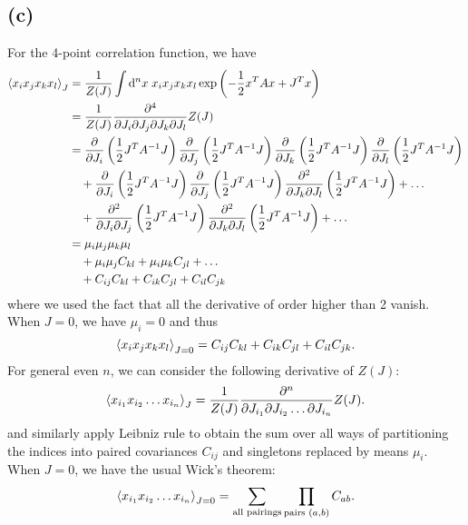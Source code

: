 \documentclass{article}
\begin{document}
\subsection*{(c)}
For the 4-point correlation function, we have
\begin{equation}
    \begin{split}
        \expval{x_i x_j x_k x_l}_J &= \frac{1}{Z(J)} \int \dd^n x \; x_i x_j x_k x_l \exp\left(-\frac{1}{2} x^T A x + J^T x\right)\\ 
                                   &= \frac{1}{Z(J)} \frac{\partial^4}{\partial J_i \partial J_j \partial J_k \partial J_l} Z(J)\\
                                   &= \frac{\partial}{\partial J_i} \left( \frac{1}{2} J^T A^{-1} J  \right)  \frac{\partial}{\partial J_j} \left( \frac{1}{2} J^T A^{-1} J  \right) \frac{\partial}{\partial J_k} \left( \frac{1}{2} J^T A^{-1} J \right)  \frac{\partial}{\partial J_l} \left( \frac{1}{2} J^T A^{-1} J \right)\\
                                   &\quad+\frac{\partial}{\partial J_i} \left( \frac{1}{2} J^T A^{-1} J  \right)\frac{\partial}{\partial J_j} \left( \frac{1}{2} J^T A^{-1} J  \right)\frac{\partial^2}{\partial J_k \partial J_l} \left( \frac{1}{2} J^T A^{-1} J \right)+\dots\\
                                   &\quad + \frac{\partial^2}{\partial J_i \partial J_j} \left( \frac{1}{2} J^T A^{-1} J \right) \frac{\partial^2}{\partial J_k \partial J_l} \left( \frac{1}{2} J^T A^{-1} J \right)+\dots\\
                                   &=\mu_i \mu_j \mu_k \mu_l\\
                                   &\quad+\mu_i\mu_j C_{kl}+\mu_i\mu_k C_{jl}+\dots\\
                                   &\quad + C_{ij} C_{kl} + C_{ik} C_{jl} + C_{il} C_{jk}
    \end{split}
\end{equation}
where we used the fact that all the derivative of order higher than 2 vanish.
When $J=0$, we have $\mu_i=0$ and thus
\begin{equation}
    \expval{x_i x_j x_k x_l}_{J=0} = C_{ij} C_{kl} + C_{ik} C_{jl} + C_{il} C_{jk}.
\end{equation}
For general even $n$, we can consider the following derivative of $Z(J)$:
\begin{equation}
    \expval{x_{i_1} x_{i_2} \dots x_{i_n}}_J = \frac{1}{Z(J)}\frac{\partial^n}{\partial J_{i_1} \partial J_{i_2} \dots \partial J_{i_n}} Z(J).
\end{equation}
and similarly apply Leibniz rule to obtain the sum over all ways of partitioning the indices into paired covariances $C_{ij}$ and singletons replaced by means $\mu_i$.
When $J=0$, we have the usual Wick's theorem:
\begin{equation}
    \expval{x_{i_1} x_{i_2} \dots x_{i_n}}_{J=0} = \sum_{\text{all pairings}} \prod_{\text{pairs }(a,b)} C_{ab}.
\end{equation}
\end{document}
